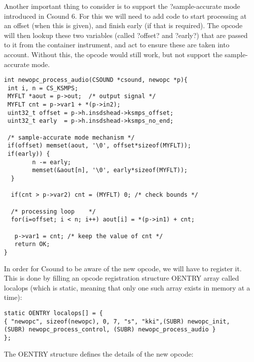 \documentclass[11pt]{article}
\begin{document}
Another important thing to consider is to support the ?sample-accurate mode introduced in Csound 6. For this we will need to add code to start processing at an offset (when this is given), and finish early (if that is required). The opcode will then lookup these two variables (called ?offset? and ?early?) that are passed to it from the container instrument, and act to ensure these are taken into account. Without this, the opcode would still work, but not support the sample-accurate mode.

\begin{lstlisting}
int newopc_process_audio(CSOUND *csound, newopc *p){
 int i, n = CS_KSMPS;
 MYFLT *aout = p->out;  /* output signal */
 MYFLT cnt = p->var1 + *(p->in2);
 uint32_t offset = p->h.insdshead->ksmps_offset;
 uint32_t early  = p->h.insdshead->ksmps_no_end;

 /* sample-accurate mode mechanism */
 if(offset) memset(aout, '\0', offset*sizeof(MYFLT));
 if(early)) {
        n -= early;
        memset(&aout[n], '\0', early*sizeof(MYFLT));
  }         

  if(cnt > p->var2) cnt = (MYFLT) 0; /* check bounds */
	
  /* processing loop    */
  for(i=offset; i < n; i++) aout[i] = *(p->in1) + cnt;
	
   p->var1 = cnt; /* keep the value of cnt */
   return OK;
}
\end{lstlisting}


In order for Csound to be aware of the new opcode, we will have to register it. This is done by filling an opcode registration structure OENTRY array called localops (which is static, meaning that only one such array exists in memory at a time):

\begin{lstlisting}
static OENTRY localops[] = {
{ "newopc", sizeof(newopc), 0, 7, "s", "kki",(SUBR) newopc_init, 
(SUBR) newopc_process_control, (SUBR) newopc_process_audio }
};
\end{lstlisting}

The OENTRY structure defines the details of the new opcode:
\end{document}
